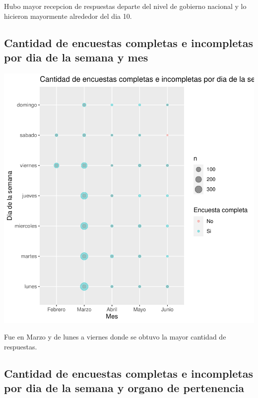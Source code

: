 \documentclass{article}
\begin{document}
Hubo mayor recepcion de respuestas departe del nivel de gobierno nacional y lo hicieron mayormente alrededor del dia 10.

\subsection{Cantidad de encuestas completas e incompletas por dia de la semana y mes}

\includegraphics{seguimientov3-020}

Fue en Marzo y de lunes a viernes donde se obtuvo la mayor cantidad de respuestas.

\subsection{Cantidad de encuestas completas e incompletas por dia de la semana y organo de pertenencia}
\end{document}
